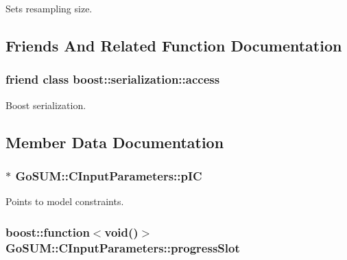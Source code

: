 Sets resampling size. 



\subsection{Friends And Related Function Documentation}
\hypertarget{class_go_s_u_m_1_1_c_input_parameters_ac98d07dd8f7b70e16ccb9a01abf56b9c}{
\subsubsection[{boost\-::serialization\-::access}]{\setlength{\rightskip}{0pt plus 5cm}friend class boost\-::serialization\-::access\hspace{0.3cm}{\ttfamily [friend]}}}\label{class_go_s_u_m_1_1_c_input_parameters_ac98d07dd8f7b70e16ccb9a01abf56b9c}


Boost serialization. 



\subsection{Member Data Documentation}
\hypertarget{class_go_s_u_m_1_1_c_input_parameters_a6ea7a2d7d1ceb033321890c5313a6595}{
\subsubsection[{p\-I\-C}]{$\ast$ Go\-S\-U\-M\-::\-C\-Input\-Parameters\-::p\-I\-C\hspace{0.3cm}{\ttfamily [private]}}}\label{class_go_s_u_m_1_1_c_input_parameters_a6ea7a2d7d1ceb033321890c5313a6595}


Points to model constraints. 

\hypertarget{class_go_s_u_m_1_1_c_input_parameters_a7b08f28eae560f682cacb13647cd75ac}{
\subsubsection[{progress\-Slot}]{\setlength{\rightskip}{0pt plus 5cm}boost\-::function$<$void()$>$ Go\-S\-U\-M\-::\-C\-Input\-Parameters\-::progress\-Slot}}\label{class_go_s_u_m_1_1_c_input_parameters_a7b08f28eae560f682cacb13647cd75ac}


